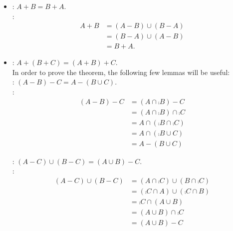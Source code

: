 \documentclass[12pt]{book}
\begin{document}
\begin{enumerate}
\begin{enumerate}
{\begin{itemize}
\item {}: $A + B = B + A$.\\
: \begin{align*}A + B &= (A - B) \cup (B - A)\tag{Definition of symmetric difference}\\&=
(B - A) \cup (A - B)\tag{5.1.2}\\&= 
B + A.\tag{Definition of symmetric difference}\end{align*}
\item {}: $A + (B + C) = (A + B) + C$.\\
In order to prove the theorem, the following few lemmas will be useful:\\
: $(A - B) - C = A - (B \cup C)$.\\
: \begin{align*}(A - B) - C &= (A \cap \comp{B}) - C \tag{Definition of relative complement}\\&= (A \cap \comp{B}) \cap \comp{C}\tag{Definition of relative complement}\\&= A \cap (\comp{B} \cap \comp{C}) \tag{5.1.1'}\\&= A \cap (\comp{B \cup C})\tag{5.1.13}\\&= A - (B \cup C)\tag{Definition of relative complement}\end{align*} 

: $(A - C) \cup (B - C) = (A \cup B) - C$.\\
: \begin{align*}(A - C) \cup (B - C) &= (A \cap \comp{C}) \cup (B \cap \comp{C})\tag{Definition of relative complement}\\&= (\comp{C} \cap A) \cup (\comp{C} \cap B)\tag{5.1.2'}\\&= \comp{C} \cap (A \cup B)\tag{5.1.3'}\\&= (A \cup B) \cap \comp{C}\tag{5.1.2'}\\&= (A \cup B) - C \tag{Definition of relative complement}\end{align*}


\end{itemize}}
\end{enumerate}
\end{enumerate}
\end{document}
